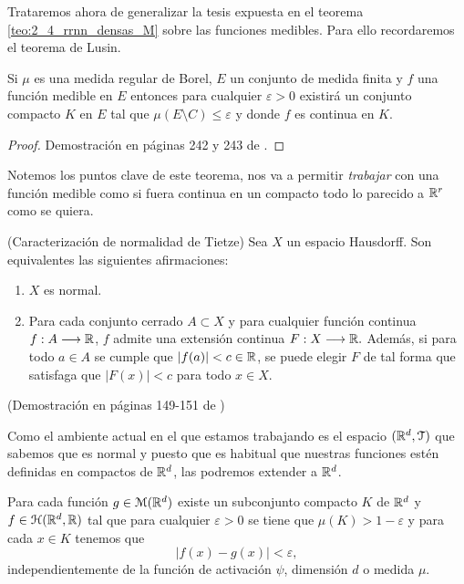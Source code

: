 %

Trataremos ahora de generalizar la tesis expuesta en 
 el teorema \ref{teo:2_4_rrnn_densas_M} sobre las funciones medibles. 
 Para ello recordaremos el teorema de Lusin.
\begin{teorema} \label{teo:Lusin}
    Si $\mu$ es una medida regular de Borel, $E$ un conjunto de medida finita 
    y $f$ una función medible en $E$ entonces
    para cualquier $\varepsilon > 0$ existirá un conjunto compacto 
    $K$ en $E$ tal que $\mu(E \setminus C) \leq \varepsilon$ y donde $f$ es continua en $K$. 
\end{teorema}
\begin{proof}
    Demostración en páginas 242 y 243 de \cite{nla.cat-vn1819421}.
\end{proof}  

Notemos los puntos clave de este teorema, nos va a permitir \textit{trabajar} con una función medible como si fuera continua en un compacto
todo lo parecido a $\mathbb{R}^r$ como se quiera. 
 
\begin{teorema}(Caracterización de normalidad de Tietze)\label{teo:Tietze}
    Sea $X$ un espacio Hausdorff. Son equivalentes las siguientes afirmaciones: 
    \begin{enumerate}
        \item $X$ es normal.
        \item Para cada conjunto cerrado $A \subset X$ y para cualquier función continua 
        $f: A \longrightarrow \mathbb{R}$, $f$ admite una extensión continua $F:X \longrightarrow \mathbb{R}.$
        Además, si para todo $a \in A$ se cumple que $|f(a)| < c \in \mathbb{R}$, se puede elegir $F$
        de tal forma que satisfaga que $|F(x)| < c$ para todo $x\in X.$ 
    \end{enumerate}
    (Demostración en páginas 149-151 de \cite{james1966topology})
\end{teorema}

Como el ambiente actual en el que estamos trabajando 
es el espacio $(\mathbb{R}^d, \mathcal{T})$ que sabemos que es normal y puesto que es habitual que nuestras funciones estén definidas
en  compactos de $\mathbb{R}^d$, las podremos extender a $\mathbb{R}^d$. 


\begin{corolario} \label{cor:2_1}
    Para cada función $g \in \mathcal{M}(\mathbb{R}^d)$ existe un subconjunto compacto 
    $K$ de $\mathbb{R}^d$ y $f \in \mathcal{H}(\mathbb{R}^d,\mathbb{R})$ tal que para cualquier 
    $\varepsilon > 0$ se tiene que 
    $\mu(K) > 1- \varepsilon$ y para cada $x \in K$ tenemos que 
    \begin{equation}
        |f(x) - g(x) | < \varepsilon,
    \end{equation}
    independientemente de la función de activación $\psi$, dimensión $d$ o medida $\mu$. 
\end{corolario}

